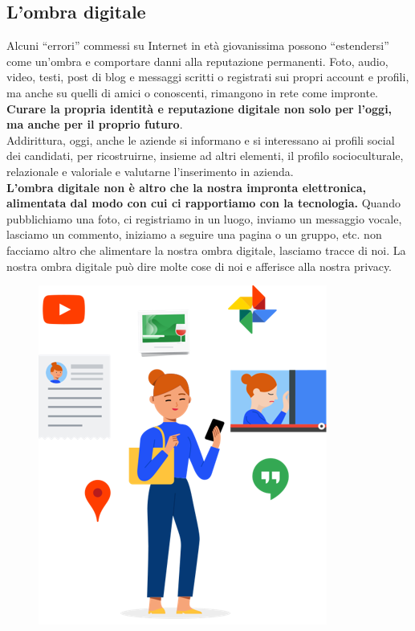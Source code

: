 \documentclass{article}
\begin{document}
		\subsection{L'ombra digitale}
		Alcuni “errori” commessi su Internet in età giovanissima possono “estendersi” come un’ombra e comportare danni alla reputazione permanenti. Foto, audio, video, testi, post di blog e messaggi scritti o registrati sui propri account e profili, ma anche su quelli di amici o conoscenti, rimangono in rete come impronte.\\
		\textbf{Curare la propria identità e reputazione digitale non solo per l'oggi, ma anche per il proprio futuro}.\\
		Addirittura, oggi, anche le aziende si informano e si interessano ai profili social dei candidati, per ricostruirne, insieme ad altri elementi, il profilo socioculturale, relazionale e valoriale e valutarne l’inserimento in azienda.\\
		\textbf{L’ombra digitale non è altro che la nostra impronta elettronica, alimentata dal modo con cui ci rapportiamo con la tecnologia.} Quando pubblichiamo una foto, ci registriamo in un luogo, inviamo un messaggio vocale, lasciamo un commento, iniziamo a seguire una pagina o un gruppo, etc. non facciamo altro che alimentare la nostra ombra digitale, lasciamo tracce di noi. La nostra ombra digitale può dire molte cose di noi e afferisce alla nostra privacy. \\
		\begin{figure}[h!]
			\centering
			\includegraphics[scale=0.5]{Image1.png}
		\end{figure}
\end{document}
